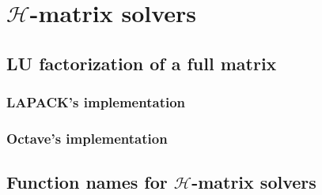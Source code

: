 \documentclass[11pt, a4paper]{book}
\begin{document}
\section{$\mathcal{H}$-matrix solvers}

\subsection{LU factorization of a full matrix}

\subsubsection{LAPACK's implementation}

\subsubsection{Octave's implementation}

\subsection{Function names for $\mathcal{H}$-matrix solvers}
\end{document}
